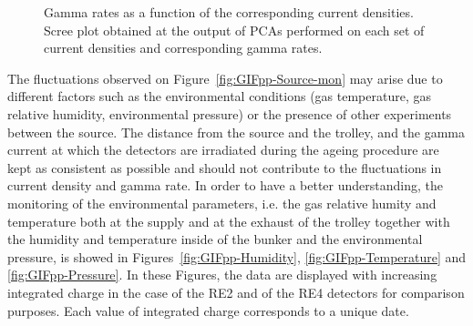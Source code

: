 \begin{figure}[H]
\begin{subfigure}{0.5\linewidth}
        	\caption{\label{fig:GIFpp-J_R_correlation:B}}
    	\end{subfigure}
		\caption{\label{fig:GIFpp-J_R_correlation}  Gamma rates as a function of the corresponding current densities.  Scree plot obtained at the output of PCAs performed on each set of current densities and corresponding gamma rates.}
	\end{figure}
	
	The fluctuations observed on Figure~\ref{fig:GIFpp-Source-mon} may arise due to different factors such as the environmental conditions (gas temperature, gas relative humidity, environmental pressure) or the presence of other experiments between the source. The distance from the source and the trolley, and the gamma current at which the detectors are irradiated during the ageing procedure are kept as consistent as possible and should not contribute to the fluctuations in current density and gamma rate. In order to have a better understanding, the monitoring of the environmental parameters, i.e. the gas relative humity and temperature both at the supply and at the exhaust of the trolley together with the humidity and temperature inside of the bunker and the environmental pressure, is showed in Figures~\ref{fig:GIFpp-Humidity}, \ref{fig:GIFpp-Temperature} and \ref{fig:GIFpp-Pressure}. In these Figures, the data are displayed with increasing integrated charge in the case of the RE2 and of the RE4 detectors for comparison purposes. Each value of integrated charge corresponds to a unique date.

